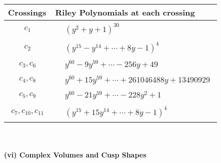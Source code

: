 \documentclass[1p]{elsarticle_modified}
\theoremstyle{definition}
\begin{document}
\begin{tabular}{m{50pt}|m{274pt}}
Crossings & \hspace{64pt}Riley Polynomials at each crossing \\
\hline $$\begin{aligned}c_{1}\end{aligned}$$&$\begin{aligned}
&(y^2+y+1)^{30}
\end{aligned}$\\
\hline $$\begin{aligned}c_{2}\end{aligned}$$&$\begin{aligned}
&(y^{15}- y^{14}+\cdots+8 y-1)^{4}
\end{aligned}$\\
\hline $$\begin{aligned}c_{3},c_{6}\end{aligned}$$&$\begin{aligned}
&y^{60}-9 y^{59}+\cdots-256 y+49
\end{aligned}$\\
\hline $$\begin{aligned}c_{4},c_{8}\end{aligned}$$&$\begin{aligned}
&y^{60}+15 y^{59}+\cdots+261046488 y+13490929
\end{aligned}$\\
\hline $$\begin{aligned}c_{5},c_{9}\end{aligned}$$&$\begin{aligned}
&y^{60}-21 y^{59}+\cdots-228 y^2+1
\end{aligned}$\\
\hline $$\begin{aligned}c_{7},c_{10},c_{11}\end{aligned}$$&$\begin{aligned}
&(y^{15}+15 y^{14}+\cdots+8 y-1)^{4}
\end{aligned}$\\
\hline
\end{tabular}\\~\\
\newpage\flushleft \textbf{(vi) Complex Volumes and Cusp Shapes}
\end{document}
